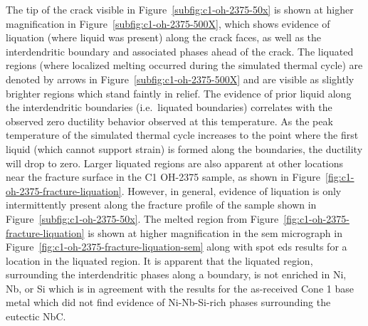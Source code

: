 {The tip of the crack visible in Figure~\ref{subfig:c1-oh-2375-50x} is shown at higher magnification in Figure~\ref{subfig:c1-oh-2375-500X}, which shows evidence of liquation (where liquid was present) along the crack faces, as well as the interdendritic boundary and associated phases ahead of the crack. The liquated regions (where localized melting occurred during the simulated thermal cycle) are denoted by arrows in Figure~\ref{subfig:c1-oh-2375-500X} and are visible as slightly brighter regions which stand faintly in relief. The evidence of prior liquid along the interdendritic boundaries (i.e.~liquated boundaries) correlates with the observed zero ductility behavior observed at this temperature. As the peak temperature of the simulated thermal cycle increases to the point where the first liquid (which cannot support strain) is formed along the boundaries, the ductility will drop to zero. Larger liquated regions are also apparent at other locations near the fracture surface in the C1 OH-2375 sample, as shown in Figure~\ref{fig:c1-oh-2375-fracture-liquation}. However, in general, evidence of liquation is only intermittently present along the fracture profile of the sample shown in Figure~\ref{subfig:c1-oh-2375-50x}. The melted region from Figure~\ref{fig:c1-oh-2375-fracture-liquation} is shown at higher magnification in the \gls{sem} micrograph in Figure~\ref{fig:c1-oh-2375-fracture-liquation-sem} along with spot \gls{eds} results for a location in the liquated region. It is apparent that the liquated region, surrounding the interdendritic phases along a boundary, is not enriched in Ni, Nb, or Si which is in agreement with the results for the as-received Cone 1 base metal which did not find evidence of Ni-Nb-Si-rich phases surrounding the eutectic NbC.

}
